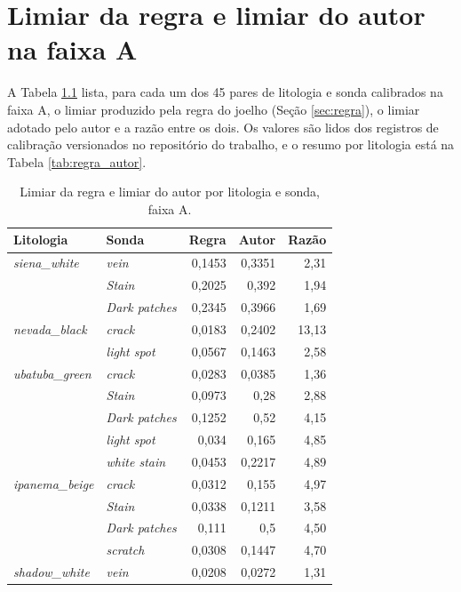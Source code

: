 \chapter{Limiar da regra e limiar do autor na faixa A}
\label{apendice:regra_autor}

A Tabela \ref{tab:apendice_regra_autor} lista, para cada um dos 45 pares de litologia e sonda calibrados na faixa A, o limiar produzido pela regra do joelho (Seção \ref{sec:regra}), o limiar adotado pelo autor e a razão entre os dois. Os valores são lidos dos registros de calibração versionados no repositório do trabalho, e o resumo por litologia está na Tabela \ref{tab:regra_autor}.

\begin{table}[ht]
  \caption{Limiar da regra e limiar do autor por litologia e sonda, faixa A.}
  \label{tab:apendice_regra_autor}
  \centering
  \footnotesize
  \renewcommand{\arraystretch}{1.0}
  \begin{tabular}{llrrr}
    \hline
    \bfseries Litologia & \bfseries Sonda & \bfseries Regra & \bfseries Autor & \bfseries Razão \\
    \hline
    \textit{siena\_white} & \textit{vein} & 0,1453 & 0,3351 & 2,31 \\
     & \textit{Stain} & 0,2025 & 0,392 & 1,94 \\
     & \textit{Dark patches} & 0,2345 & 0,3966 & 1,69 \\
    \textit{nevada\_black} & \textit{crack} & 0,0183 & 0,2402 & 13,13 \\
     & \textit{light spot} & 0,0567 & 0,1463 & 2,58 \\
    \textit{ubatuba\_green} & \textit{crack} & 0,0283 & 0,0385 & 1,36 \\
     & \textit{Stain} & 0,0973 & 0,28 & 2,88 \\
     & \textit{Dark patches} & 0,1252 & 0,52 & 4,15 \\
     & \textit{light spot} & 0,034 & 0,165 & 4,85 \\
     & \textit{white stain} & 0,0453 & 0,2217 & 4,89 \\
    \textit{ipanema\_beige} & \textit{crack} & 0,0312 & 0,155 & 4,97 \\
     & \textit{Stain} & 0,0338 & 0,1211 & 3,58 \\
     & \textit{Dark patches} & 0,111 & 0,5 & 4,50 \\
     & \textit{scratch} & 0,0308 & 0,1447 & 4,70 \\
    \textit{shadow\_white} & \textit{vein} & 0,0208 & 0,0272 & 1,31 \\

\end{tabular}
\end{table}
